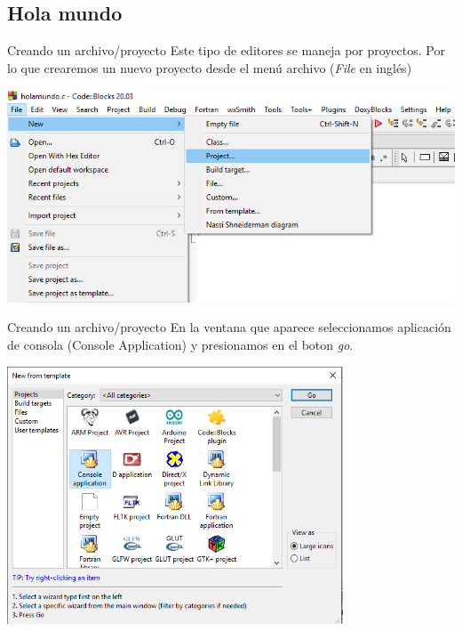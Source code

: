 \documentclass[11pt]{beamer}
\begin{document}
\subsection{Hola mundo}
\begin{frame}{Creando un archivo/proyecto}
    \justifying
    Este tipo de editores se maneja por proyectos. Por lo que crearemos un nuevo proyecto desde el menú archivo (\emph{File} en inglés)
    
    \centering
    \includegraphics[width=\textwidth]{cb24_1.png}
\end{frame}
\begin{frame}{Creando un archivo/proyecto}
    \justifying
    En la ventana que aparece seleccionamos aplicación de consola (Console Application) y presionamos en el boton \emph{go}.
    
    \centering
    \includegraphics[width=0.75\textwidth]{cb25_1.png}
\end{frame}
\end{document}
